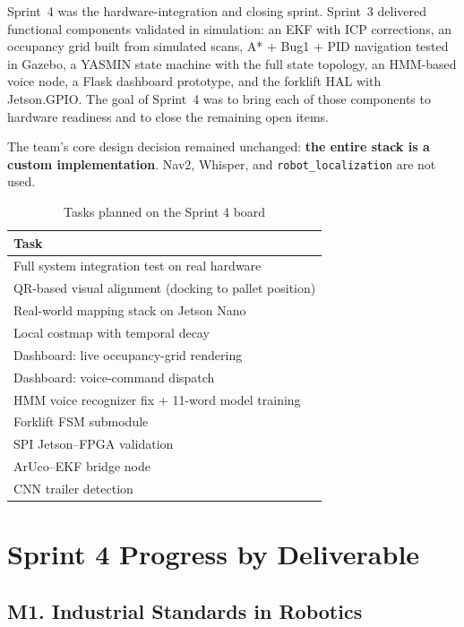 \documentclass[conference]{IEEEtran}
\begin{document}
Sprint~4 was the hardware-integration and closing sprint. Sprint~3 delivered
functional components validated in simulation: an EKF with ICP corrections,
an occupancy grid built from simulated scans, A* + Bug1 + PID navigation
tested in Gazebo, a YASMIN state machine with the full state topology, an
HMM-based voice node, a Flask dashboard prototype, and the forklift HAL with
Jetson.GPIO. The goal of Sprint~4 was to bring each of those components to
hardware readiness and to close the remaining open items.

The team's core design decision remained unchanged:
\textbf{the entire stack is a custom implementation}. Nav2, Whisper, and
\texttt{robot\_localization} are not used.


\begin{table}[h]
\caption{Tasks planned on the Sprint 4 board}
\label{tab:sprint4_board}
\renewcommand{\arraystretch}{1.2}
\centering
\begin{tabular}{>{\raggedright\arraybackslash}p{}}
\toprule
\textbf{Task} \\
\midrule
Full system integration test on real hardware \\
QR-based visual alignment (docking to pallet position) \\
Real-world mapping stack on Jetson Nano \\
Local costmap with temporal decay \\
Dashboard: live occupancy-grid rendering \\
Dashboard: voice-command dispatch \\
HMM voice recognizer fix + 11-word model training \\
Forklift FSM submodule \\
SPI Jetson--FPGA validation \\
ArUco--EKF bridge node \\
CNN trailer detection \\
\bottomrule
\end{tabular}
\end{table}

\section{Sprint 4 Progress by Deliverable}

\subsection{M1. Industrial Standards in Robotics}
\end{document}
